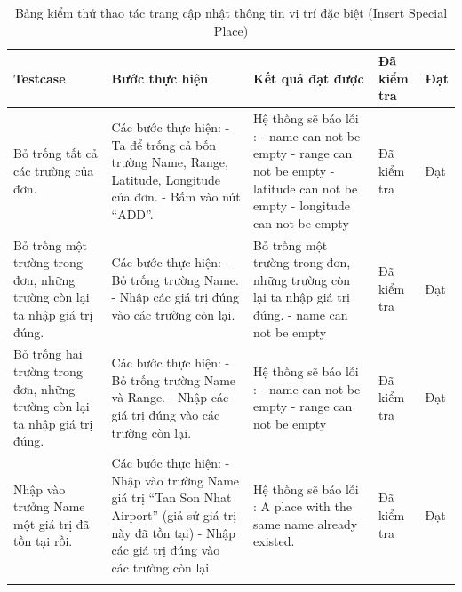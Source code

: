 \documentclass{article}
\begin{document}
\begin{longtable}{ | p{} |p{} | p{}  | p{}  | p{}  | } 
\hline
\textbf{Testcase}& \textbf{Bước thực hiện}& \textbf{Kết quả đạt được} & \textbf{Đã kiểm tra}& \textbf{Đạt} \\ 
\hline
\hline
Bỏ trống tất cả các trường của đơn. &
Các bước thực hiện: \newline
- Ta để trống cả bốn trường Name, Range, Latitude, Longitude của đơn. \newline
- Bấm vào nút “ADD”.
&
Hệ thống sẽ báo lỗi :  \newline
- name can not be empty \newline
- range can not be empty \newline
- latitude can not be empty \newline
- longitude can not be empty
 &
Đã kiểm tra &
Đạt \\

\hline
Bỏ trống một trường trong đơn, những trường còn lại ta nhập giá trị đúng. &
Các bước thực hiện: \newline
- Bỏ trống trường Name.  \newline
- Nhập các giá trị đúng vào các trường còn lại. 
&
Bỏ trống một trường trong đơn, những trường còn lại ta nhập giá trị đúng.  \newline
- name can not be empty
 &
Đã kiểm tra &
Đạt \\

\hline
Bỏ trống hai trường trong đơn, những trường còn lại ta nhập giá trị đúng. &
Các bước thực hiện: \newline
- Bỏ trống trường Name và Range.   \newline
- Nhập các giá trị đúng vào các trường còn lại. 
&
Hệ thống sẽ báo lỗi : \newline
- name can not be empty \newline
- range can not be empty
 &
Đã kiểm tra &
Đạt \\

\hline
Nhập vào trưởng Name một giá trị đã tồn tại rồi. &
Các bước thực hiện: \newline
- Nhập vào trường Name giá trị 
“Tan Son Nhat Airport” (giả sử giá trị này đã tồn tại) \newline
- Nhập các giá trị đúng vào các trường còn lại. 
&
Hệ thống sẽ báo lỗi : A place with the same name already existed.
 &
Đã kiểm tra &
Đạt \\

\hline
\caption{Bảng kiểm thử thao tác trang cập nhật thông tin vị trí đặc biệt (Insert Special Place)}
\end{longtable}
\end{document}
